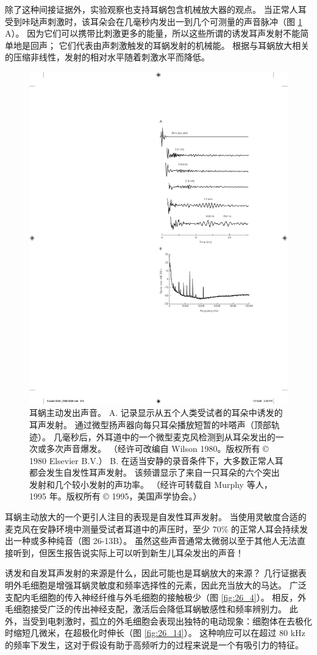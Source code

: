 除了这种间接证据外，实验观察也支持耳蜗包含机械放大器的观点。 当正常人耳受到咔哒声刺激时，该耳朵会在几毫秒内发出一到几个可测量的声音脉冲（图 \ref{fig:26_13} A）。 
因为它们可以携带比刺激更多的能量，所以这些所谓的诱发耳声发射不能简单地是回声； 
它们代表由声刺激触发的耳蜗发射的机械能。 
根据与耳蜗放大相关的压缩非线性，发射的相对水平随着刺激水平而降低。

\begin{figure}[htbp]
	\centering
	\includegraphics[width=0.5\linewidth]{chap26/fig_26_13}
	\caption{耳蜗主动发出声音。 A. 记录显示从五个人类受试者的耳朵中诱发的耳声发射。 通过微型扬声器向每只耳朵播放短暂的咔嗒声（顶部轨迹）。 几毫秒后，外耳道中的一个微型麦克风检测到从耳朵发出的一次或多次声音爆发。 （经许可改编自 Wilson 1980。版权所有 © 1980 Elsevier B.V.） B. 在适当安静的录音条件下，大多数正常人耳都会发生自发性耳声发射。 该频谱显示了来自一只耳朵的六个突出发射和几个较小发射的声功率。 （经许可转载自 Murphy 等人，1995 年。版权所有 © 1995，美国声学协会。）}
	\label{fig:26_13}
\end{figure}


耳蜗主动放大的一个更引人注目的表现是自发性耳声发射。 当使用灵敏度合适的麦克风在安静环境中测量受试者耳道中的声压时，至少 70\% 的正常人耳会持续发出一种或多种纯音（图 26-13B）。 虽然这些声音通常太微弱以至于其他人无法直接听到，但医生报告说实际上可以听到新生儿耳朵发出的声音！

诱发和自发耳声发射的来源是什么，因此可能也是耳蜗放大的来源？ 几行证据表明外毛细胞是增强耳蜗灵敏度和频率选择性的元素，因此充当放大的马达。 广泛支配内毛细胞的传入神经纤维与外毛细胞的接触极少（图 \ref{fig:26_4}）。 相反，外毛细胞接受广泛的传出神经支配，激活后会降低耳蜗敏感性和频率辨别力。 
此外，当受到电刺激时，孤立的外毛细胞会表现出独特的电动现象：细胞体在去极化时缩短几微米，在超极化时伸长（图 \ref{fig:26_14}）。 
这种响应可以在超过 80 kHz 的频率下发生，这对于假设有助于高频听力的过程来说是一个有吸引力的特征。

